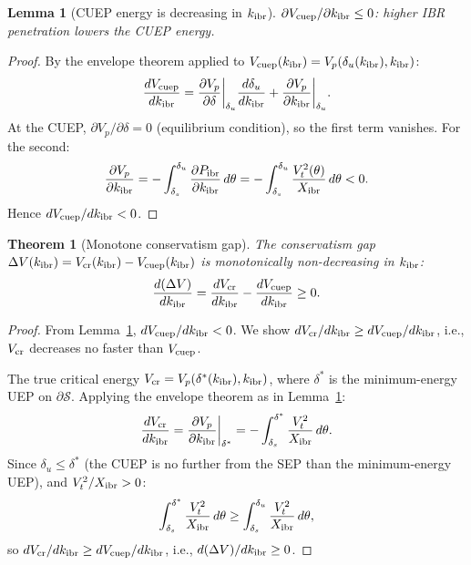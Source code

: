 \documentclass[journal]{IEEEtran}
\newtheorem{theorem}{Theorem}
\newtheorem{lemma}{Lemma}
\newcommand{\kibr}{k_{\rm ibr}}
\newcommand{\Vcuep}{V_{\rm cuep}}
\newcommand{\Vcr}{V_{\rm cr}}
\newcommand{\deltau}{\delta_u}
\newcommand{\deltas}{\delta_s}
\newcommand{\DeltaV}{\Delta V}
\newcommand{\calS}{\mathcal{S}}
\begin{document}
\begin{lemma}[CUEP energy is decreasing in $\kibr$]
\label{lem:vcuep_monotone}
$\partial\Vcuep/\partial\kibr \leq 0$: higher IBR penetration
lowers the CUEP energy.
\end{lemma}

\begin{proof}
By the envelope theorem applied to $\Vcuep(\kibr) = V_p(\deltau(\kibr), \kibr)$:
\begin{equation}
  \frac{d\Vcuep}{d\kibr}
  = \frac{\partial V_p}{\partial\delta}\bigg|_{\deltau}\frac{d\deltau}{d\kibr}
    + \frac{\partial V_p}{\partial\kibr}\bigg|_{\deltau}.
  \label{eq:dvdk}
\end{equation}
At the CUEP, $\partial V_p/\partial\delta = 0$ (equilibrium condition),
so the first term vanishes.  For the second:
\[
  \frac{\partial V_p}{\partial\kibr}
  = -\int_{\deltas}^{\deltau}
    \frac{\partial P_{\rm ibr}}{\partial\kibr}\,d\theta
  = -\int_{\deltas}^{\deltau} \frac{V_t^2(\theta)}{X_{\rm ibr}}\,d\theta < 0.
\]
Hence $d\Vcuep/d\kibr < 0$.
\end{proof}

\begin{theorem}[Monotone conservatism gap]
\label{thm:monotone}
The conservatism gap $\DeltaV(\kibr) = \Vcr(\kibr) - \Vcuep(\kibr)$
is monotonically non-decreasing in $\kibr$:
\begin{equation}
  \frac{d(\DeltaV)}{d\kibr}
  = \frac{d\Vcr}{d\kibr} - \frac{d\Vcuep}{d\kibr} \geq 0.
  \label{eq:monotone}
\end{equation}
\end{theorem}

\begin{proof}
From Lemma~\ref{lem:vcuep_monotone}, $d\Vcuep/d\kibr < 0$.
We show $d\Vcr/d\kibr \geq d\Vcuep/d\kibr$, i.e., $\Vcr$ decreases
no faster than $\Vcuep$.

The true critical energy $\Vcr = V_p(\delta^*(\kibr), \kibr)$,
where $\delta^*$ is the minimum-energy UEP on $\partial\calS$.
Applying the envelope theorem as in Lemma~\ref{lem:vcuep_monotone}:
\[
  \frac{d\Vcr}{d\kibr}
  = \frac{\partial V_p}{\partial\kibr}\bigg|_{\delta^*}
  = -\int_{\deltas}^{\delta^*} \frac{V_t^2}{X_{\rm ibr}}\,d\theta.
\]
Since $\deltau \leq \delta^*$ (the CUEP is no further from the SEP
than the minimum-energy UEP), and $V_t^2/X_{\rm ibr} > 0$:
\[
  \int_{\deltas}^{\delta^*} \frac{V_t^2}{X_{\rm ibr}}\,d\theta
  \geq \int_{\deltas}^{\deltau} \frac{V_t^2}{X_{\rm ibr}}\,d\theta,
\]
so $d\Vcr/d\kibr \geq d\Vcuep/d\kibr$, i.e.,
$d(\DeltaV)/d\kibr \geq 0$.
\end{proof}
\end{document}
